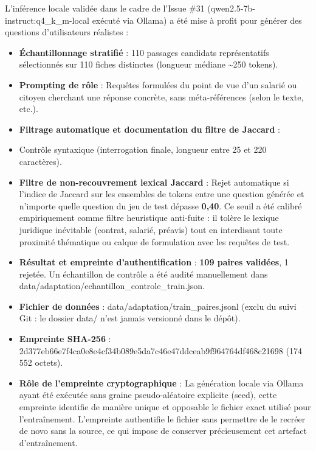 \documentclass[11pt,a4paper]{article}
\newcommand{\code}[1]  {{\ttfamily #1}}
\newcommand{\rulebreak}{}
\begin{document}
L'inférence locale validée dans le cadre de l'Issue \#31 (\code{qwen2.\allowbreak{}5-\allowbreak{}7b-\allowbreak{}instruct:\allowbreak{}q4\_\allowbreak{}k\_\allowbreak{}m-\allowbreak{}local} exécuté via Ollama) a été mise à profit pour générer des questions d'utilisateurs réalistes :
\begin{itemize}
\item \textbf{Échantillonnage stratifié} : 110 passages candidats représentatifs sélectionnés sur 110 fiches distinctes (longueur médiane \textasciitilde{}250 tokens).
\item \textbf{Prompting de rôle} : Requêtes formulées du point de vue d'un salarié ou citoyen cherchant une réponse concrète, sans méta-références (\og selon le texte\fg{}, etc.).
\item \textbf{Filtrage automatique et documentation du filtre de Jaccard} :
\item Contrôle syntaxique (interrogation finale, longueur entre 25 et 220 caractères).
\item \textbf{Filtre de non-recouvrement lexical Jaccard} : Rejet automatique si l'indice de Jaccard sur les ensembles de tokens entre une question générée et n'importe quelle question du jeu de test dépasse \textbf{0,40}. Ce seuil a été calibré empiriquement comme filtre heuristique anti-fuite : il tolère le lexique juridique inévitable (\og contrat\fg{}, \og salarié\fg{}, \og préavis\fg{}) tout en interdisant toute proximité thématique ou calque de formulation avec les requêtes de test.
\item \textbf{Résultat et empreinte d'authentification} : \textbf{109 paires validées}, 1 rejetée. Un échantillon de contrôle a été audité manuellement dans \code{data/\allowbreak{}adaptation/\allowbreak{}echantillon\_\allowbreak{}controle\_\allowbreak{}train.\allowbreak{}json}.
\item \textbf{Fichier de données} : \code{data/\allowbreak{}adaptation/\allowbreak{}train\_\allowbreak{}paires.\allowbreak{}jsonl} (exclu du suivi Git : le dossier \code{data/\allowbreak{}} n'est jamais versionné dans le dépôt).
\item \textbf{Empreinte SHA-256} : \code{2d377eb66e7f4ca0e8e4cf34b089e5da7c46e47ddceab9f964764df468c21698} (174 552 octets).
\item \textbf{Rôle de l'empreinte cryptographique} : La génération locale via Ollama ayant été exécutée sans graine pseudo-aléatoire explicite (\code{seed}), cette empreinte identifie de manière unique et opposable le fichier exact utilisé pour l'entraînement. L'empreinte authentifie le fichier sans permettre de le recréer de novo sans la source, ce qui impose de conserver précieusement cet artefact d'entraînement.
\end{itemize}
\rulebreak
\end{document}
